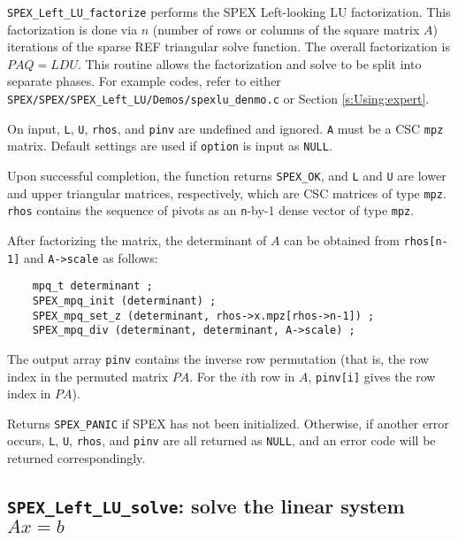 \documentclass[12pt]{report}
\theoremstyle{definition}
\begin{document}
\verb|SPEX_Left_LU_factorize| performs the SPEX Left-looking LU factorization.
This factorization is done via $n$ (number of rows or columns of the square
matrix $A$) iterations of the sparse REF triangular solve function. The overall
factorization is $PAQ = LDU$.  This routine allows the factorization and solve
to be split into separate phases.  For example codes, refer to either
\verb|SPEX/SPEX/SPEX_Left_LU/Demos/spexlu_denmo.c| or Section \ref{s:Using:expert}.

On input, \verb|L|, \verb|U|, \verb|rhos|, and \verb|pinv| are undefined and
ignored.  \verb|A| must be a CSC \verb|mpz| matrix. Default settings are used
if \verb|option| is input as \verb|NULL|.

Upon successful completion, the function returns \verb|SPEX_OK|, and \verb|L|
and \verb|U| are lower and upper triangular matrices, respectively, which are
CSC matrices of type \verb|mpz|.  \verb|rhos| contains the sequence of pivots
as an \verb|n|-by-1 dense vector of type \verb|mpz|.

After factorizing the matrix, the determinant of $A$ can be obtained from
\verb|rhos[n-1]| and \verb|A->scale| as follows:

\begin{verbatim}
    mpq_t determinant ;
    SPEX_mpq_init (determinant) ;
    SPEX_mpq_set_z (determinant, rhos->x.mpz[rhos->n-1]) ;
    SPEX_mpq_div (determinant, determinant, A->scale) ;
\end{verbatim}

The output array \verb|pinv| contains the inverse row permutation (that is, the
row index in the permuted matrix $PA$. For the $i$th row in $A$, \verb|pinv[i]|
gives the row index in $PA$). 

Returns \verb|SPEX_PANIC| if SPEX has not been initialized.  Otherwise, if
another error occurs, \verb|L|, \verb|U|, \verb|rhos|, and \verb|pinv| are all
returned as \verb|NULL|, and an error code will be returned correspondingly.

\cprotect\subsection{\verb|SPEX_Left_LU_solve|: solve the linear system $Ax=b$}
\label{ss:SPEX_Left_LU_solve}
\end{document}
